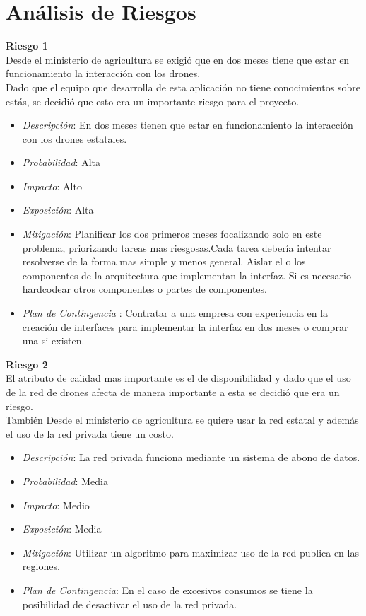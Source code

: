 \section{Análisis de Riesgos}
\textbf{Riesgo 1}\\
Desde el ministerio de agricultura se exigi\'o que en dos meses tiene que estar en funcionamiento la interacci\'on con los drones.\\
Dado que el equipo que desarrolla de esta aplicaci\'on no tiene conocimientos sobre est\'as, se decidi\'o que esto era un importante riesgo para el proyecto.\\



\begin{itemize}
\item \textsl{Descripci\'on}: En dos meses tienen que estar en funcionamiento la interacción con los drones estatales.
 \item \textsl{Probabilidad}: Alta
 \item \textsl{Impacto}: Alto
 \item \textsl{Exposición}: Alta
 \item \textsl{Mitigación}: Planificar los dos primeros meses focalizando solo en este problema, priorizando tareas mas riesgosas.Cada tarea deber\'ia intentar resolverse de la forma mas simple y menos general. Aislar el o los  componentes de la arquitectura que implementan la interfaz. Si es necesario hardcodear otros componentes o partes de componentes.
 \item \textsl{Plan de Contingencia} : Contratar a una empresa con experiencia en la creaci\'on de interfaces para implementar la interfaz en dos meses o comprar una si existen.
 \end{itemize}
\textbf{Riesgo 2}\\
 El atributo de calidad mas importante es el de disponibilidad y dado que el uso de la red de drones afecta de manera importante a esta se decidi\'o que era un riesgo.\\
 Tambi\'en Desde el ministerio de agricultura se quiere usar la red estatal y adem\'as el uso de la red privada tiene un costo.\\
 
 
\begin{itemize}
 \item \textsl{Descripci\'on}: La red privada funciona mediante un sistema de abono de datos.
 \item \textsl{Probabilidad}: Media
 \item \textsl{Impacto}: Medio
 \item \textsl{Exposición}: Media
 \item \textsl{Mitigación}: Utilizar un algoritmo para maximizar uso de la red publica en las regiones.
 \item \textsl{Plan de Contingencia}: En el caso de excesivos consumos se tiene la posibilidad de desactivar el uso de la red privada.
\end{itemize}

